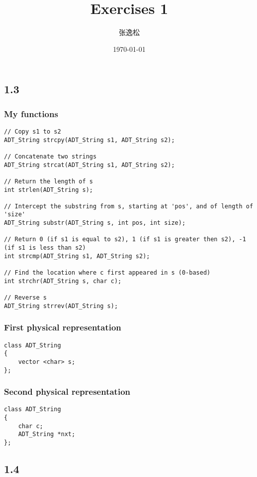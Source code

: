 \documentclass[12pt]{ctexart}
\title{Exercises 1}
\author{张逸松}
\date{\today}
\begin{document}
    \maketitle
    \subsection*{1.3}
        \subsubsection*{My functions}
        \begin{lstlisting}
// Copy s1 to s2 
ADT_String strcpy(ADT_String s1, ADT_String s2);

// Concatenate two strings
ADT_String strcat(ADT_String s1, ADT_String s2);

// Return the length of s
int strlen(ADT_String s);

// Intercept the substring from s, starting at 'pos', and of length of 'size'
ADT_String substr(ADT_String s, int pos, int size);

// Return 0 (if s1 is equal to s2), 1 (if s1 is greater then s2), -1 (if s1 is less than s2)
int strcmp(ADT_String s1, ADT_String s2);

// Find the location where c first appeared in s (0-based)
int strchr(ADT_String s, char c);

// Reverse s
ADT_String strrev(ADT_String s);
        \end{lstlisting}

        \subsubsection*{First physical representation}
        \begin{lstlisting}
class ADT_String
{
    vector <char> s;
};
        \end{lstlisting}

        \subsubsection*{Second physical representation}
        \begin{lstlisting}
class ADT_String
{
    char c;
    ADT_String *nxt;
};
        \end{lstlisting}

    \subsection*{1.4}
\end{document}
